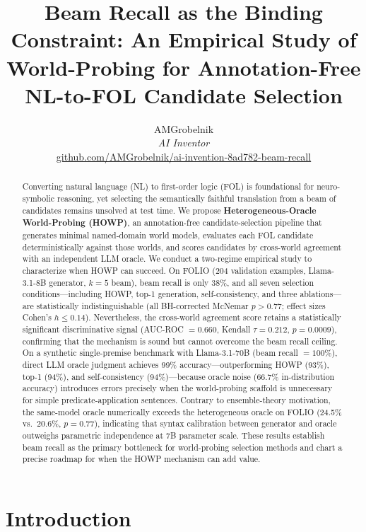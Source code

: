 \documentclass[11pt,letterpaper]{article}
\title{\textbf{Beam Recall as the Binding Constraint: An Empirical Study of World-Probing for Annotation-Free NL-to-FOL Candidate Selection}}
\author{
AMGrobelnik \\
\textit{AI Inventor} \\
\href{https://github.com/AMGrobelnik/ai-invention-8ad782-beam-recall-as-the-binding-constraint-an}{github.com/AMGrobelnik/ai-invention-8ad782-beam-recall}
}
\date{}
\begin{document}
\maketitle

\begin{abstract}
Converting natural language (NL) to first-order logic (FOL) is foundational for neuro-symbolic reasoning, yet selecting the semantically faithful translation from a beam of candidates remains unsolved at test time. We propose \textbf{Heterogeneous-Oracle World-Probing (HOWP)}, an annotation-free candidate-selection pipeline that generates minimal named-domain world models, evaluates each FOL candidate deterministically against those worlds, and scores candidates by cross-world agreement with an independent LLM oracle. We conduct a two-regime empirical study to characterize when HOWP can succeed. On FOLIO (204 validation examples, Llama-3.1-8B generator, $k{=}5$ beam), beam recall is only 38\%, and all seven selection conditions---including HOWP, top-1 generation, self-consistency, and three ablations---are statistically indistinguishable (all BH-corrected McNemar $p > 0.77$; effect sizes Cohen's $h \leq 0.14$). Nevertheless, the cross-world agreement score retains a statistically significant discriminative signal (AUC-ROC $= 0.660$, Kendall $\tau = 0.212$, $p = 0.0009$), confirming that the mechanism is sound but cannot overcome the beam recall ceiling. On a synthetic single-premise benchmark with Llama-3.1-70B (beam recall $= 100\%$), direct LLM oracle judgment achieves 99\% accuracy---outperforming HOWP (93\%), top-1 (94\%), and self-consistency (94\%)---because oracle noise (66.7\% in-distribution accuracy) introduces errors precisely when the world-probing scaffold is unnecessary for simple predicate-application sentences. Contrary to ensemble-theory motivation, the same-model oracle numerically exceeds the heterogeneous oracle on FOLIO (24.5\% vs.\ 20.6\%, $p = 0.77$), indicating that syntax calibration between generator and oracle outweighs parametric independence at 7B parameter scale. These results establish beam recall as the primary bottleneck for world-probing selection methods and chart a precise roadmap for when the HOWP mechanism can add value.
\end{abstract}

\section{Introduction}
\end{document}
